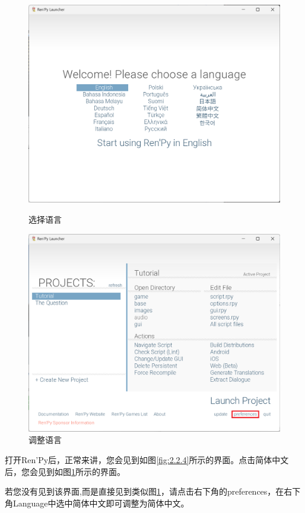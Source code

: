 \begin{figure}[htbp]
    \centering
    \begin{minipage}{182pt}
        \centering
        \includegraphics[scale=.2]{Pictures/1/1.2/1.2.4.png}
        \caption{选择语言}
        \label{fig:2.2.4}
    \end{minipage}
    \hspace{10pt}
    \begin{minipage}{182pt}
        \centering
        \includegraphics[scale=.2]{Pictures/1/1.2/1.2.5.png}
        \caption{调整语言}
        \label{fig:2.2.5}
    \end{minipage}
\end{figure}

打开Ren'Py后，正常来讲，您会见到如图\ref{fig:2.2.4}所示的界面。点击简体中文后，您会见到如图\ref{fig:2.2.5}所示的界面。

若您没有见到该界面,而是直接见到类似图\ref{fig:2.2.5}，请点击右下角的preferences，在右下角Language中选中简体中文即可调整为简体中文。
